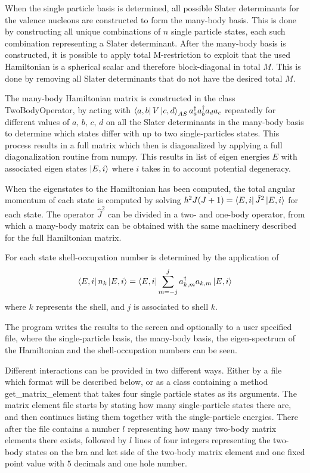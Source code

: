 
When the single particle basis is determined, all possible Slater determinants for the valence nucleons are constructed to form the many-body basis.
This is done by constructing all unique combinations of \(n\) single particle states, each such combination representing a Slater determinant.
After the many-body basis is constructed, it is possible to apply total M-restriction to exploit that the used Hamiltonian is a spherical scalar and therefore block-diagonal in total \(M\). This is done by removing all Slater determinants that do not have the desired total \(M\).

The many-body Hamiltonian matrix is constructed in the class TwoBodyOperator, by acting with \(\bra{a,b}V\ket{c,d}_{AS}a^\dagger_a a^\dagger_b a_d a_c\) repeatedly for different values of \(a,\,b,\,c,\,d\) on all the Slater determinants in the many-body basis to determine which states differ with up to two single-particles states. This process results in a full matrix
which then is diagonalized by applying a full diagonalization routine from numpy. %
This results in list of eigen energies \(E\) with associated eigen states \(\ket{E,i}\) where \(i\) takes in to account potential degeneracy.

When the eigenstates to the Hamiltonian has been computed, the total angular momentum of each state is computed by solving  \(\hbar^2 J(J+1) = \bra{E,i}\hat{J}^2\ket{E,i}\) for each state. The operator \(\hat{J}^2\) can be divided in a two- and one-body operator, from which a many-body matrix can be obtained with the same machinery described for the full Hamiltonian matrix.

For each state shell-occupation number is determined by the application of
\begin{equation}
  \bra{E,i}n_k\ket{E,i}=\bra{E,i}\sum_{m=-j}^j a^\dagger_{k,m}a_{k,m}\ket{E,i}
\end{equation}
where \(k\) represents the shell, and \(j\) is associated to shell \(k\).

The program writes the results to the screen and optionally to a user specified file, where the single-particle basis, the many-body basis, the eigen-spectrum of the Hamiltonian and the shell-occupation numbers can be seen.

Different interactions can be provided in two different ways. Either by a file which format will be described below, or as a class containing a method get\_matrix\_element that takes four single particle states as its arguments.
The matrix element file starts by stating how many single-particle states there are, and then continues listing them together with the single-particle energies. There after the file contains a number \(l\) representing how many two-body matrix elements there exists, followed by \(l\) lines of four integers representing the two-body states on the bra and ket side of the two-body matrix element and one fixed point value with \(5\) decimals and one hole number.
